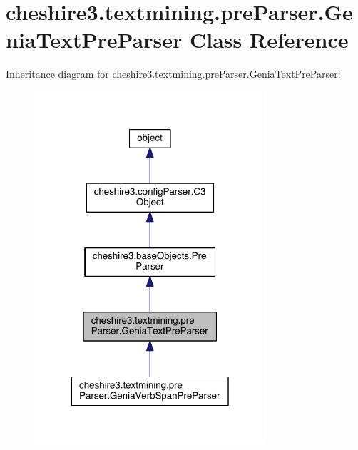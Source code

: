 \hypertarget{classcheshire3_1_1textmining_1_1pre_parser_1_1_genia_text_pre_parser}{\section{cheshire3.\-textmining.\-pre\-Parser.\-Genia\-Text\-Pre\-Parser Class Reference}
\label{classcheshire3_1_1textmining_1_1pre_parser_1_1_genia_text_pre_parser}
}


Inheritance diagram for cheshire3.\-textmining.\-pre\-Parser.\-Genia\-Text\-Pre\-Parser\-:
\nopagebreak
\begin{figure}[H]
\begin{center}
\leavevmode
\includegraphics[width=244pt]{classcheshire3_1_1textmining_1_1pre_parser_1_1_genia_text_pre_parser__inherit__graph}
\end{center}
\end{figure}


